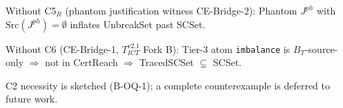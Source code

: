 \begin{proposition}[C5$_R$ necessary]
Without C5$_R$ (phantom justification witness CE-Bridge-2):
Phantom $J^{ph}$ with $\mathrm{Src}(J^{ph})=\emptyset$ inflates UnbreakSet past SCSet.
\end{proposition}

\begin{proposition}[C6 necessary]
Without C6 (CE-Bridge-1, $T_{ICT}^{v2.1}$ Fork B):
Tier-3 atom \texttt{imbalance} is $B_T$-source-only
$\Rightarrow$ not in CertReach $\Rightarrow$ TracedSCSet $\subsetneq$ SCSet.
\end{proposition}

\begin{remark}
C2 necessity is sketched (B-OQ-1); a complete counterexample is deferred to
future work.
\end{remark}
